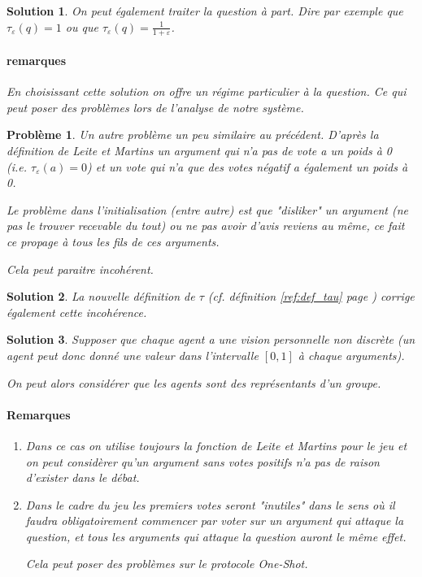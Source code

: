 \documentclass[12pt]{article}
\theoremstyle{defi}
\theoremstyle{not}
\theoremstyle{prob}
\newtheorem{problem}{Problème}[section]
\newtheorem{solution}{Solution}[problem]
\begin{document}
\begin{solution}
  On peut également traiter la question à part. Dire par exemple que $\tau_\varepsilon(q) = 1$ ou que $\tau_\varepsilon(q) = \frac{1}{1 + \varepsilon}$.

  \paragraph{remarques}
    En choisissant cette solution on offre un régime particulier à la question. Ce qui peut poser des problèmes lors de l'analyse de notre système.
\end{solution}

\color{blue}
  \begin{problem}
    Un autre problème un peu similaire au précédent. D'après la définition de Leite et Martins un argument qui n'a pas de vote a un poids à 0 (i.e. $\tau_\varepsilon (a) = 0$) et un vote qui n'a que des votes négatif a également un poids à 0.

    Le problème dans l'initialisation (entre autre) est que "disliker" un argument (ne pas le trouver recevable du tout) ou ne pas avoir d'avis reviens au même, ce fait ce propage à tous les fils de ces arguments.

    Cela peut paraitre incohérent.


  \end{problem}

  \begin{solution}
    La nouvelle définition de $\tau$ (cf. définition \ref{ref:def_tau} page \pageref{ref:def_tau}) corrige également cette incohérence.
  \end{solution}

\color{red}
  \begin{solution}
    Supposer que chaque agent a une vision personnelle non discrète (un agent peut donc donné une valeur dans l'intervalle $[0,1]$ à chaque arguments).

    On peut alors considérer que les agents sont des représentants d'un groupe.

    \paragraph{Remarques}
      \begin{enumerate}
        \item Dans ce cas on utilise toujours la fonction de Leite et Martins pour le jeu et on peut considèrer qu'un argument sans votes positifs n'a pas de raison d'exister dans le débat.

        \item Dans le cadre du jeu les premiers votes seront "inutiles" dans le sens où il faudra obligatoirement commencer par voter sur un argument qui attaque la question, et tous les arguments qui attaque la question auront le même effet.

        Cela peut poser des problèmes sur le protocole One-Shot.
      \end{enumerate}
  \end{solution}
\end{document}

